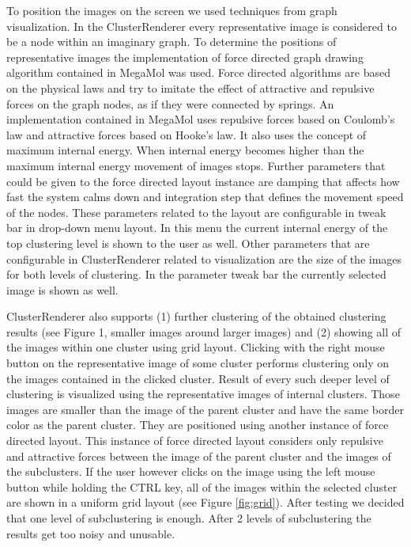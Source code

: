 \documentclass[journal]{vgtc}       %
\begin{document}
To position the images on the screen we used techniques from graph visualization. In the ClusterRenderer every representative image is considered to be a node within an imaginary graph. To determine the positions of representative images the implementation of force directed graph drawing algorithm contained in MegaMol was used. Force directed algorithms are based on the physical laws and try to imitate the effect of attractive and repulsive forces on the graph nodes, as if they were connected by springs. An implementation contained in MegaMol uses repulsive forces based on Coulomb's law and attractive forces based on Hooke’s law. It also uses the concept of maximum internal energy. When internal energy becomes higher than the maximum internal energy movement of images stops. Further parameters that could be given to the force directed layout instance are damping that affects how fast the system calms down and integration step that defines the movement speed of the nodes. 
These parameters related to the layout are configurable in tweak bar in drop-down menu layout. In this menu the current internal energy of the top clustering level is shown to the user as well.
Other parameters that are configurable in ClusterRenderer related to visualization are the size of the images for both levels of clustering. In the parameter tweak bar the currently selected image is shown as well. 

ClusterRenderer also supports (1) further clustering of the obtained clustering results (see Figure 1, smaller images around larger images) and (2) showing all of the images within one cluster using grid layout. Clicking with the right mouse button on the representative image of some cluster performs clustering only on the images contained in the clicked cluster. Result of every such deeper level of clustering is visualized using the representative images of internal clusters. Those images  are smaller than the image of the parent cluster and have the same border color as the parent cluster. They are positioned using another instance of force directed layout. This instance of force directed layout considers only repulsive and attractive forces between the image of the parent cluster and the images of the subclusters. If the user however clicks on the image using the left mouse button while holding the CTRL key, all of the images within the selected cluster are shown in a uniform grid layout (see Figure \ref{fig:grid}). 
After testing we decided that one level of subclustering is enough. After 2 levels of subclustering the results get too  noisy and unusable.
\end{document}
